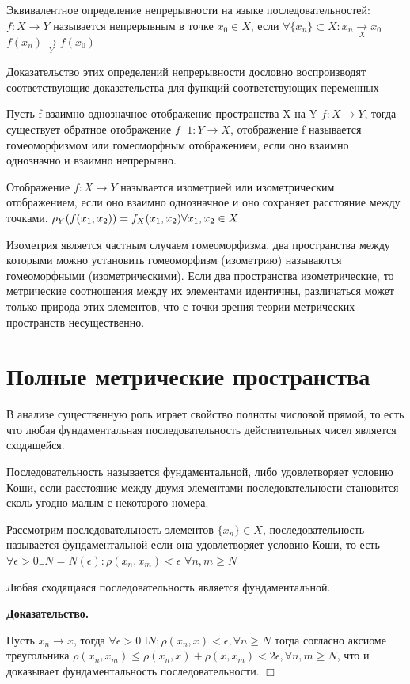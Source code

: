\documentclass[12pt]{report}
\renewcommand{\[}{$\\\displaystyle}
\renewcommand{\]}{\\$}
\renewcommand{\[}{$\\\displaystyle}
\newcommand{\btev}[1][]{\textbf{Доказательство#1.}
}
\newcommand{\etev}{$\Box$}
\begin{document}
Эквивалентное определение непрерывности на языке последовательностей:
$f: X \rightarrow Y$ называется непрерывным в точке $x_0 \in X$, если
$\forall \{x_n\}\subset X: x_n\xrightarrow[X]{} x_0$
$f(x_n) \xrightarrow[Y]{} f(x_0)$

Доказательство этих определений непрерывности дословно воспроизводят
соответствующие доказательства для функций соответствующих переменных

Пусть f взаимно однозначное отображение пространства X на Y
$f: X \rightarrow Y$, тогда существует обратное отображение
$f^-1: Y\rightarrow X$, отображение f называется гомеоморфизмом или гомеоморфным
отображением, если оно взаимно однозначно и взаимно непрерывно.

Отображение $f: X \rightarrow Y$ называется изометрией или изометрическим
отображением, если оно взаимно однозначное и оно сохраняет расстояние между
точками.
\[ \rho_Y(f(x_1,x_2))=f_X(x_1,x_2)\forall x_1,x_2\in X\]

Изометрия является частным случаем гомеоморфизма, два пространства между
которыми можно установить гомеоморфизм (изометрию) называются гомеоморфными
(изометрическими). Если два пространства изометрические, то метрические
соотношения между их элементами идентичны, различаться может только природа
этих элементов, что с точки зрения теории метрических пространств несущественно.

\section{Полные метрические пространства}

В анализе существенную роль играет свойство полноты числовой прямой, то есть
что любая фундаментальная последовательность действительных чисел является
сходящейся.

Последовательность называется фундаментальной, либо удовлетворяет условию Коши,
если расстояние между двумя элементами последовательности становится сколь
угодно малым с некоторого номера.

Рассмотрим последовательность элементов $\{x_n\} \in X$, последовательность
называется фундаментальной если она удовлетворяет условию Коши, то есть
$ \forall \epsilon > 0 \exists N = N(\epsilon): \rho(x_n, x_m) < \epsilon $
$ \forall n, m \geq N $

Любая сходящаяся последовательность является фундаментальной.

\btev[]

Пусть $x_n \rightarrow x$, тогда
$\forall \epsilon >0 \exists N: \rho(x_n, x) < \epsilon, \forall n \geq N$
тогда согласно аксиоме треугольника
$\rho(x_n, x_m) \leq \rho(x_n, x)+\rho(x, x_m) < 2\epsilon, \forall n, m \geq N$,
что и доказывает фундаментальность последовательности. \etev
\end{document}
